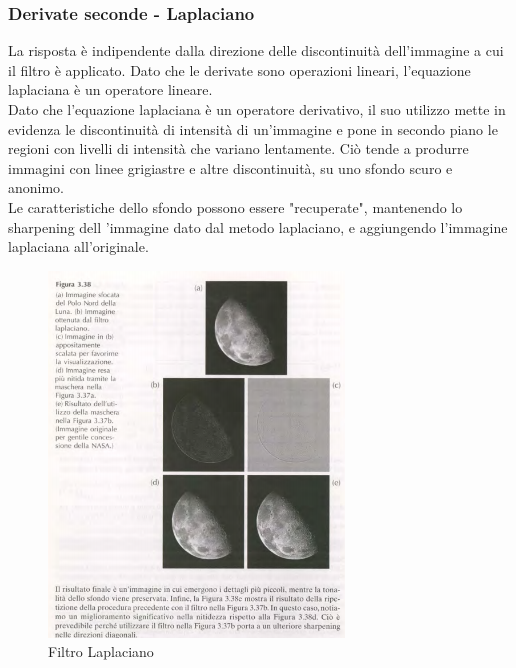 \documentclass[12pt]{article}
\begin{document}
\subsubsection{Derivate seconde - Laplaciano}
La risposta è indipendente dalla direzione delle discontinuità dell'immagine a cui il filtro è applicato. Dato che le derivate sono operazioni lineari, l'equazione laplaciana è un operatore lineare.\\
Dato che l'equazione laplaciana è un operatore derivativo, il suo utilizzo mette in evidenza le discontinuità di intensità di un'immagine e pone in secondo piano le regioni con livelli di intensità che variano lentamente. Ciò tende a produrre immagini con linee grigiastre e altre discontinuità, su uno sfondo scuro e anonimo.\\
Le caratteristiche dello sfondo possono essere "recuperate", mantenendo lo
sharpening dell 'immagine dato dal metodo laplaciano, e aggiungendo l'immagine laplaciana all'originale.
\begin{figure}[!htb]
    \centering
    \includegraphics[width=0.7\textwidth]{Images/lap.png}
    \caption{Filtro Laplaciano}
\end{figure}
\FloatBarrier
\end{document}
